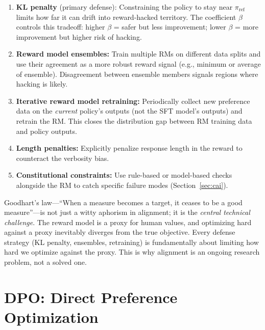 \begin{enumerate}[leftmargin=*]
\item \textbf{KL penalty} (primary defense):
  Constraining the policy to stay near $\pi_{\text{ref}}$ limits how far
  it can drift into reward-hacked territory.  The coefficient $\beta$
  controls this tradeoff: higher $\beta$ = safer but less improvement;
  lower $\beta$ = more improvement but higher risk of hacking.

\item \textbf{Reward model ensembles:}
  Train multiple RMs on different data splits and use their agreement as
  a more robust reward signal (e.g., minimum or average of ensemble).
  Disagreement between ensemble members signals regions where hacking
  is likely.

\item \textbf{Iterative reward model retraining:}
  Periodically collect new preference data on the \emph{current} policy's
  outputs (not the SFT model's outputs) and retrain the RM.  This closes
  the distribution gap between RM training data and policy outputs.

\item \textbf{Length penalties:}
  Explicitly penalize response length in the reward to counteract the
  verbosity bias.

\item \textbf{Constitutional constraints:}
  Use rule-based or model-based checks alongside the RM to catch specific
  failure modes (Section~\ref{sec:cai}).
\end{enumerate}

\begin{keyinsight}
Goodhart's law---``When a measure becomes a target, it ceases to be a good
measure''---is not just a witty aphorism in alignment; it is the
\emph{central technical challenge}.  The reward model is a proxy for human
values, and optimizing hard against a proxy inevitably diverges from the
true objective.  Every defense strategy (KL penalty, ensembles, retraining)
is fundamentally about limiting how hard we optimize against the proxy.
This is why alignment is an ongoing research problem, not a solved one.
\end{keyinsight}


\section{DPO: Direct Preference Optimization}
\label{sec:dpo}

